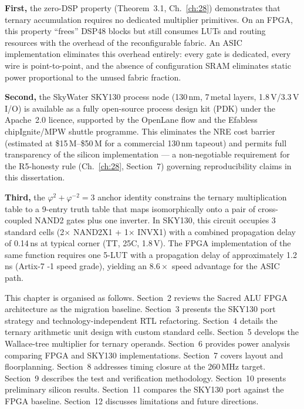 \textbf{First,} the zero-DSP property (Theorem~3.1, Ch.~\ref{ch:28})
demonstrates that ternary accumulation requires no dedicated multiplier
primitives. On an FPGA, this property ``frees'' DSP48 blocks but still
consumes LUTs and routing resources with the overhead of the reconfigurable
fabric. An ASIC implementation eliminates this overhead entirely: every
gate is dedicated, every wire is point-to-point, and the absence of
configuration SRAM eliminates static power proportional to the unused
fabric fraction.

\textbf{Second,} the SkyWater SKY130 process node (130\,nm, 7\,metal
layers, 1.8\,V/3.3\,V I/O) is available as a fully open-source process
design kit (PDK) under the Apache~2.0 licence, supported by the OpenLane
flow and the Efabless chipIgnite/MPW shuttle programme. This eliminates
the NRE cost barrier (estimated at \$15\,M--\$50\,M for a commercial
130\,nm tapeout) and permits full transparency of the silicon
implementation --- a non-negotiable requirement for the R5-honesty rule
(Ch.~\ref{ch:28}, Section~7) governing reproducibility claims in this
dissertation.

\textbf{Third,} the \(\varphi^2 + \varphi^{-2} = 3\) anchor identity
constrains the ternary multiplication table to a 9-entry truth table
that maps isomorphically onto a pair of cross-coupled NAND2 gates plus
one inverter. In SKY130, this circuit occupies 3 standard cells
(2$\times$ NAND2X1 + 1$\times$ INVX1) with a combined propagation delay
of 0.14\,ns at typical corner (TT, 25\textdegree C, 1.8\,V). The
FPGA implementation of the same function requires one 5-LUT with a
propagation delay of approximately 1.2\,ns (Artix-7 -1 speed grade),
yielding an \(8.6\times\) speed advantage for the ASIC path.

This chapter is organised as follows. Section~2 reviews the Sacred ALU
FPGA architecture as the migration baseline. Section~3 presents the
SKY130 port strategy and technology-independent RTL refactoring.
Section~4 details the ternary arithmetic unit design with custom
standard cells. Section~5 develops the Wallace-tree multiplier for
ternary operands. Section~6 provides power analysis comparing FPGA
and SKY130 implementations. Section~7 covers layout and floorplanning.
Section~8 addresses timing closure at the 260\,MHz target.
Section~9 describes the test and verification methodology.
Section~10 presents preliminary silicon results. Section~11 compares
the SKY130 port against the FPGA baseline. Section~12 discusses
limitations and future directions.

